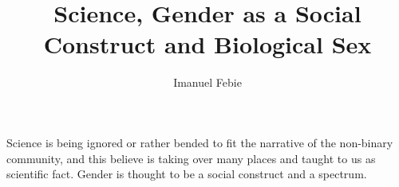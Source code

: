 \documentclass[12pt]{article}
\begin{document}
\title{Science, Gender as a Social Construct and Biological Sex}
\author{Imanuel Febie}
\maketitle


Science is being ignored or rather bended to fit the narrative of the non-binary community, and this believe is taking over many places and taught to us as scientific fact. Gender is thought to be a social construct and a spectrum. 
 
 

 

 
 
\end{document}
